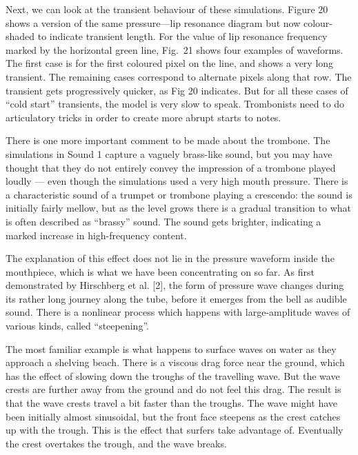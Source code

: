   Next, we can look at the transient behaviour of these simulations. Figure 20 
  shows a version of the same pressure—lip resonance diagram but now 
  colour-shaded to indicate transient length. For the value of lip resonance 
  frequency marked by the horizontal green line, Fig.\ 21 shows four examples 
  of waveforms. The first case is for the first coloured pixel on the line, and 
  shows a very long transient. The remaining cases correspond to alternate 
  pixels along that row. The transient gets progressively quicker, as Fig 20 
  indicates. But for all these cases of “cold start” transients, the model is 
  very slow to speak. Trombonists need to do articulatory tricks in order to 
  create more abrupt starts to notes. 






  There is one more important comment to be made about the trombone. The 
  simulations in Sound 1 capture a vaguely brass-like sound, but you may have 
  thought that they do not entirely convey the impression of a trombone played 
  loudly — even though the simulations used a very high mouth pressure. There 
  is a characteristic sound of a trumpet or trombone playing a crescendo: the 
  sound is initially fairly mellow, but as the level grows there is a gradual 
  transition to what is often described as “brassy” sound. The sound gets 
  brighter, indicating a marked increase in high-frequency content. 

  The explanation of this effect does not lie in the pressure waveform inside 
  the mouthpiece, which is what we have been concentrating on so far. As first 
  demonstrated by Hirschberg et al. [2], the form of pressure wave changes 
  during its rather long journey along the tube, before it emerges from the 
  bell as audible sound. There is a nonlinear process which happens with 
  large-amplitude waves of various kinds, called “steepening”. 

  The most familiar example is what happens to surface waves on water as they 
  approach a shelving beach. There is a viscous drag force near the ground, 
  which has the effect of slowing down the troughs of the travelling wave. But 
  the wave crests are further away from the ground and do not feel this drag. 
  The result is that the wave crests travel a bit faster than the troughs. The 
  wave might have been initially almost sinusoidal, but the front face steepens 
  as the crest catches up with the trough. This is the effect that surfers take 
  advantage of. Eventually the crest overtakes the trough, and the wave breaks. 

